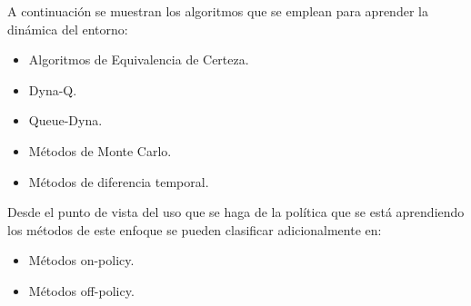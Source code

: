 A continuación se muestran los algoritmos que se emplean para aprender la dinámica del entorno:
\begin{itemize}
\item Algoritmos de Equivalencia de Certeza.
\item Dyna-Q.
\item Queue-Dyna.
\item Métodos de Monte Carlo.
\item Métodos de diferencia temporal.
\end{itemize}

Desde el punto de vista del uso que se haga de la política que se está aprendiendo los métodos de este enfoque se pueden clasificar adicionalmente en:
\begin{itemize}
\item Métodos on-policy.
\item Métodos off-policy.
\end{itemize}
